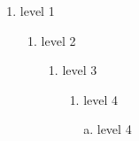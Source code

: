 \begin{enumerate}
    \item level 1
    \begin{enumerate}
        \item level 2
        \begin{enumerate}
            \item level 3
            \begin{enumerate}
                \item level 4
                \item[a.] level 4
            \end{enumerate}
        \end{enumerate}
    \end{enumerate}
\end{enumerate}